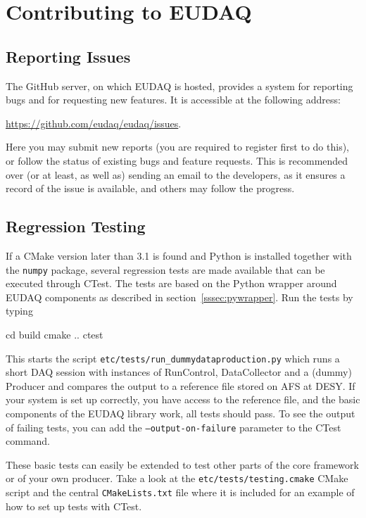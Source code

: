 \section{Contributing to EUDAQ}
\label{sec:contributing}

\subsection{Reporting Issues}
\label{sec:reporting}
The GitHub server, on which EUDAQ is hosted, provides a system for reporting bugs and for requesting new features.
It is accessible at the following address: 

\url{https://github.com/eudaq/eudaq/issues}.

Here you may submit new reports (you are required to register first to do this),
or follow the status of existing bugs and feature requests.
This is recommended over (or at least, as well as) sending an email to the developers,
as it ensures a record of the issue is available, and others may follow the progress.

\subsection{Regression Testing}
\label{sec:ctest}

If a CMake version later than 3.1 is found and Python is installed
together with the \texttt{numpy} package, several regression tests are made
available that can be executed through CTest. The tests are based on
the Python wrapper around EUDAQ components as described in
section~\ref{sssec:pywrapper}. Run the tests by typing

\begin{listing}[mybash]
  cd build
  cmake ..
  ctest
\end{listing}

This starts the script \texttt{etc/tests/run\_dummydataproduction.py}
which runs a short DAQ session with instances of RunControl,
DataCollector and a (dummy) Producer and compares the output to a
reference file stored on AFS at DESY. If your system is set up
correctly, you have access to the reference file, and the basic
components of the EUDAQ library work, all tests should pass.
To see the output of failing tests, you can add the
\texttt{--output-on-failure} parameter to the CTest command.

These basic tests can easily be extended to test other parts of the
core framework or of your own producer. Take a look at the
\texttt{etc/tests/testing.cmake} CMake script and the central
\texttt{CMakeLists.txt} file where it is included for an example of
how to set up tests with CTest.

